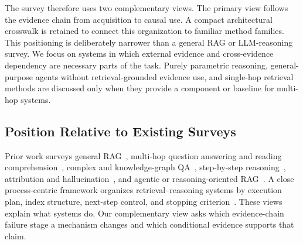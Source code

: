 \documentclass[manuscript,review]{acmart}
\theoremstyle{definition}
\theoremstyle{plain}
\theoremstyle{remark}
\begin{document}
The survey therefore uses two complementary views. The primary view follows
the evidence chain from acquisition to causal use. A compact architectural
crosswalk is retained to connect this organization to familiar method
families. This positioning is deliberately narrower than a general RAG or
LLM-reasoning survey. We focus on systems in which external evidence and
cross-evidence dependency are necessary parts of the task. Purely parametric
reasoning, general-purpose agents without retrieval-grounded evidence use,
and single-hop retrieval methods are discussed only when they provide a
component or baseline for multi-hop systems.

\subsection{Position Relative to Existing Surveys}
\label{subsec:survey_position}

Prior work surveys general RAG~\cite{gao2023ragsurvey,fan2024ragllmsurvey,
huang2024ragsurvey,zhao2024ragaigcsurvey,li2024ragdecoupledsurvey}, multi-hop
question answering and reading comprehension~\cite{mavi2022mhqasurvey,
mohammadi2024mhmrcsurvey}, complex and knowledge-graph QA~\cite{lan2021complexkbqasurvey,
gu2022knowledgesurvey,pan2024llmkgsurvey}, step-by-step reasoning~\cite{plaat2024multistepsurvey,
chu2024cotsurvey,qiao2023reasoningsurvey}, attribution and hallucination~\cite{li2023attributionsurvey,
huang2023hallucinationsurvey}, and agentic or reasoning-oriented RAG~\cite{singh2025agenticragsurvey,
liang2025reasoningragsurvey}. A close process-centric framework organizes
retrieval--reasoning systems by execution plan, index structure, next-step
control, and stopping criterion~\cite{ji2026retrievalreasoning}. These views
explain what systems do. Our complementary view asks which evidence-chain
failure stage a mechanism changes and which conditional evidence supports
that claim.
\end{document}
